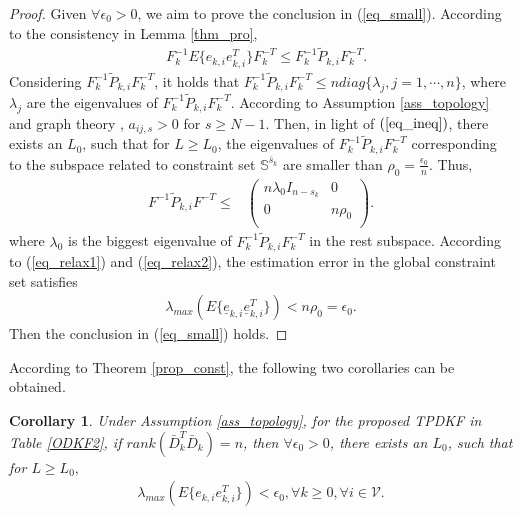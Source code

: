 \documentclass[journal,transmag]{IEEEtran}
\newtheorem{corollary}{\textbf{Corollary}}
\begin{document}
{\begin{proof}
 
    Given $\forall\epsilon_0>0$, we aim to prove the conclusion in (\ref{eq_small}). 
   According to the consistency in Lemma \ref{thm_pro}, 
   \begin{align}\label{eq_relax1}
   &F_{k}^{-1}E\{e_{k,i}e_{k,i}^T\}F_{k}^{-T}\leq F_{k}^{-1}\tilde P_{k,i}F_{k}^{-T}.
   \end{align}
  Considering $F_{k}^{-1} \tilde P_{k,i}F_{k}^{-T}$, it holds that $F_{k}^{-1} \tilde P_{k,i}F_{k}^{-T}\leq n diag\{\lambda_j,j=1,\cdots,n\}$, where $\lambda_j$ are the eigenvalues of  $F_{k}^{-1} \tilde P_{k,i}F_{k}^{-T}$.
    According to  Assumption \ref{ass_topology} and graph theory \cite{horn2012matrix, varga2009matrix}, $a_{ij,s}>0$ for $s\geq N-1$. Then, in light of $(\ref{eq_ineq})$, there exists an $L_0$, such that for 
    $L\geq L_0$, the eigenvalues of  $F_{k}^{-1} \tilde P_{k,i}F_{k}^{-T}$ corresponding to  the subspace related to constraint set $\mathbb{S}^{\bar s_k}$ are smaller than $\rho_0=\frac{\epsilon_0}{n}$. Thus,
 \begin{align}\label{eq_relax2}
 F^{-1} \tilde P_{k,i}F^{-T}
 \leq &  \left( \begin{array}{cc}
 n\lambda_{0}I_{n-s_k} & 0 \\
 0 & n\rho_0 \\
 \end{array}
 \right).
 \end{align}   
where $\lambda_{0}$  is the biggest eigenvalue of  $F_{k}^{-1} \tilde P_{k,i}F_{k}^{-T}$ in the rest subspace.
 According to (\ref{eq_relax1}) and (\ref{eq_relax2}),  
  the estimation error in the global constraint set  satisfies 
  		\begin{align}
  		\lambda_{max}\left(E\{\underline e_{k,i}\underline e_{k,i}^T\}\right)< n\rho_0=\epsilon_0.
  		\end{align}	
Then the conclusion in (\ref{eq_small}) holds.
	\end{proof}
According to Theorem \ref{prop_const}, the following two corollaries can be obtained.
\begin{corollary}\label{coro_1}
	Under Assumption \ref{ass_topology}, for the proposed TPDKF in Table \ref{ODKF2}, if $rank(\bar D_{k}^T\bar D_{k})=n$, then  $\forall\epsilon_0>0$, there exists an $L_0$, such that for $L\geq L_0,$					
	\begin{align}
\lambda_{max}\left(E\{e_{k,i} e_{k,i}^T\}\right)<\epsilon_0, \forall k\geq 0, \forall i\in\mathcal{V}.
	\end{align}
\end{corollary}
	
}
\end{document}
